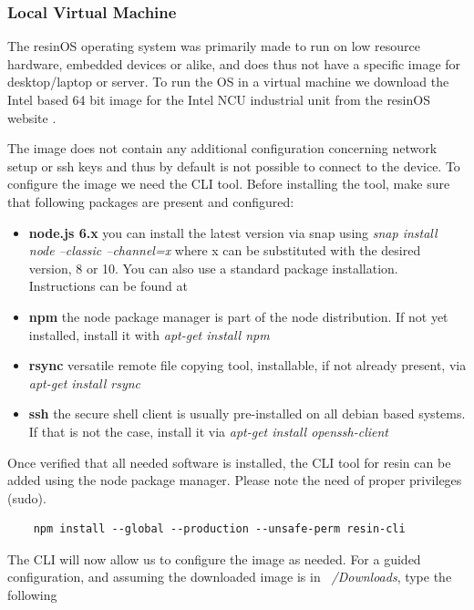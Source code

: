 \documentclass[]{scrartcl}
\begin{document}
\subsubsection{Local Virtual Machine}

The resinOS operating system was primarily made to run on low resource hardware, embedded devices or alike, and does thus not have a specific image for desktop/laptop or server. To run the OS in a virtual machine we download the Intel based 64 bit image for the Intel NCU industrial unit from the resinOS website \cite{resin01}.

The image does not contain any additional configuration concerning network setup or ssh keys and thus by default is not possible  to connect to the device.
To configure the image we need the CLI tool. Before installing the tool, make sure that following packages are present and configured:

\begin{itemize}
	
	\item \textbf{node.js 6.x} you can install the latest version via snap using \textit{snap install node --classic --channel=x} where x can be substituted with the desired version, 8 or 10. You can also use a standard package installation. Instructions can be found at \cite{node01}
	\item \textbf{npm} the node package manager is part of the node distribution. If not yet installed, install it with \textit{apt-get install npm}
	\item \textbf{rsync} versatile remote file copying tool, installable, if not already present, via \textit{apt-get install rsync}
	\item \textbf{ssh} the secure shell client is usually pre-installed on all debian based systems. If that is not the case, install it via \textit{apt-get install openssh-client}
	
\end{itemize}

Once verified that all needed software is installed, the CLI tool for resin can be added using the node package manager. Please note the need of proper privileges (sudo).

\begin{verbatim}
	npm install --global --production --unsafe-perm resin-cli
\end{verbatim}

The CLI will now allow us to configure the image as needed. For a guided configuration, and assuming the downloaded image is in \textit{~/Downloads}, type the following 
\end{document}

